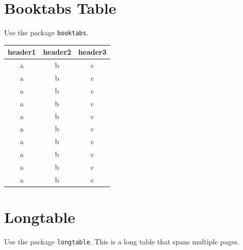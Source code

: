 \documentclass[a4paper,12pt]{article}
\begin{document}
\newpage
\section{Booktabs Table}
Use the package \verb|booktabs|.
\begin{table}[H]
    \centering
    \begin{tabular}{ccc}
        \toprule
        header1 & header2 & header3 \\
        \midrule
        a & b & c \\
        a & b & c \\
        a & b & c \\
        a & b & c \\
        a & b & c \\
        a & b & c \\
        a & b & c \\
        a & b & c \\
        a & b & c \\
        a & b & c \\
        \bottomrule
    \end{tabular}
\end{table}

\newpage
\section{Longtable}
Use the package \verb|longtable|. This is a long table that spans multiple pages.
\end{document}
